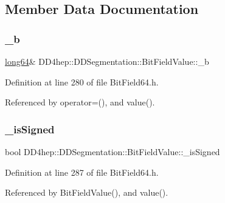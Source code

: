 \subsection{Member Data Documentation}
\hypertarget{class_d_d4hep_1_1_d_d_segmentation_1_1_bit_field_value_a0105c82bf79092f583b6c88f2e34267a}{}\label{class_d_d4hep_1_1_d_d_segmentation_1_1_bit_field_value_a0105c82bf79092f583b6c88f2e34267a} 
\subsubsection{\texorpdfstring{\+\_\+b}{\_b}}
{\footnotesize\ttfamily \hyperlink{namespace_d_d4hep_ac2a70e722b33dc7ddaa20db8954ac836}{long64}\& D\+D4hep\+::\+D\+D\+Segmentation\+::\+Bit\+Field\+Value\+::\+\_\+b\hspace{0.3cm}{\ttfamily [protected]}}



Definition at line 280 of file Bit\+Field64.\+h.



Referenced by operator=(), and value().

\hypertarget{class_d_d4hep_1_1_d_d_segmentation_1_1_bit_field_value_a22e42eb6cbef6b643840f09dccac5f42}{}\label{class_d_d4hep_1_1_d_d_segmentation_1_1_bit_field_value_a22e42eb6cbef6b643840f09dccac5f42} 
\subsubsection{\texorpdfstring{\+\_\+is\+Signed}{\_isSigned}}
{\footnotesize\ttfamily bool D\+D4hep\+::\+D\+D\+Segmentation\+::\+Bit\+Field\+Value\+::\+\_\+is\+Signed\hspace{0.3cm}{\ttfamily [protected]}}



Definition at line 287 of file Bit\+Field64.\+h.



Referenced by Bit\+Field\+Value(), and value().


